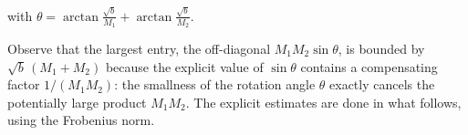 \documentclass[a4paper,11pt]{article}
\theoremstyle{definition}
\begin{document}
with $\theta= \arctan\!\frac{\sqrt b}{M_1} + \arctan\!\frac{\sqrt b}{M_2}.$

Observe that the largest entry, the off-diagonal $M_1 M_2 \sin\theta$, is bounded by $\sqrt b\,(M_1 + M_2)$ because the explicit value of $\sin\theta$ contains a compensating factor $1/(M_1 M_2)$: the smallness of the rotation angle $\theta$ exactly cancels the potentially large product $M_1 M_2$. The explicit estimates are done in what follows, using the Frobenius norm.
\end{document}
